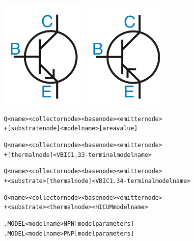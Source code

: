 



\begin{Device}\label{Q_DEVICE}

\symbol
{\includegraphics{npnSymbol}}
{\includegraphics{pnpSymbol}}

\device
\begin{alltt}
Q<name> <collector node> <base node> <emitter node>
 + [substrate node] <model name> [area value]

Q<name> <collector node> <base node> <emitter node>
 + [thermal node] <VBIC 1.3 3-terminal model name>

Q<name> <collector node> <base node> <emitter node>
 + <substrate> [thermal node] <VBIC 1.3 4-terminal model name>

 Q<name> <collector node> <base node> <emitter node>
 + <substrate> <thermal node> <HICUM model name>
\end{alltt}

\model
\begin{alltt}
.MODEL <model name> NPN [model parameters]
.MODEL <model name> PNP [model parameters]
\end{alltt}


\end{Device}
